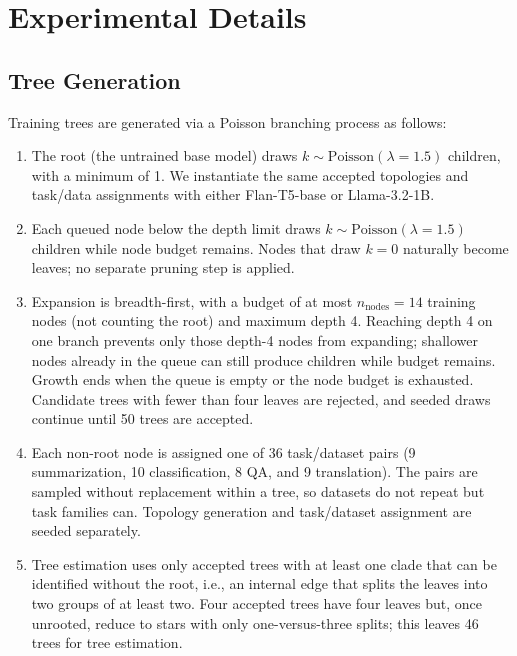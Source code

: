\documentclass{article}
\theoremstyle{definition}
\theoremstyle{plain}
\begin{document}




\appendix

\section{Experimental Details}
\label{app:details}

\subsection*{Tree Generation}
\label{app:tree-gen}

Training trees are generated via a Poisson branching process as follows:

\begin{enumerate}
    \item The root (the untrained base model) draws $k \sim \mathrm{Poisson}(\lambda = 1.5)$ children, with a minimum of 1. We instantiate the same accepted topologies and task/data assignments with either Flan-T5-base or Llama-3.2-1B.
    \item Each queued node below the depth limit draws $k \sim \mathrm{Poisson}(\lambda = 1.5)$ children while node budget remains. Nodes that draw $k = 0$ naturally become leaves; no separate pruning step is applied.
    \item Expansion is breadth-first, with a budget of at most $n_\mathrm{nodes} = 14$ training nodes (not counting the root) and maximum depth 4. Reaching depth 4 on one branch prevents only those depth-4 nodes from expanding; shallower nodes already in the queue can still produce children while budget remains. Growth ends when the queue is empty or the node budget is exhausted. Candidate trees with fewer than four leaves are rejected, and seeded draws continue until 50 trees are accepted.
    \item Each non-root node is assigned one of 36 task/dataset pairs (9 summarization, 10 classification, 8 QA, and 9 translation). The pairs are sampled without replacement within a tree, so datasets do not repeat but task families can. Topology generation and task/dataset assignment are seeded separately.
    \item Tree estimation uses only accepted trees with at least one clade that can be identified without the root, i.e., an internal edge that splits the leaves into two groups of at least two. Four accepted trees have four leaves but, once unrooted, reduce to stars with only one-versus-three splits; this leaves 46 trees for tree estimation.
\end{enumerate}
\end{document}
